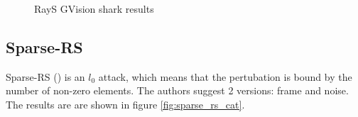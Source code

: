 \begin{figure}
\centering
 \hfill

\caption{RayS GVision shark results}
\label{fig:rays_results_shark}
\end{figure}

\subsection{Sparse-RS}
\label{sparse_rs_poc}
Sparse-RS (\cite{Croce2020SparseRSAV}) is an $l_0$ attack, which means that the pertubation is bound by the number of non-zero elements. The authors suggest 2 versions: frame and noise. The results are are shown in figure \ref{fig:sparse_rs_cat}.


